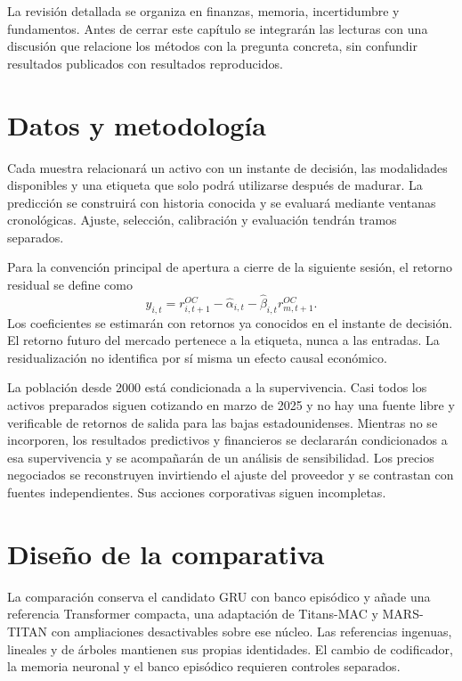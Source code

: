 \documentclass[11pt,a4paper]{report}
\begin{document}
La revisión detallada se organiza en finanzas, memoria, incertidumbre y fundamentos.
Antes de cerrar este capítulo se integrarán las lecturas con una discusión que
relacione los métodos con la pregunta concreta, sin confundir resultados publicados
con resultados reproducidos.

\chapter{Datos y metodología}
Cada muestra relacionará un activo con un instante de decisión, las modalidades
disponibles y una etiqueta que solo podrá utilizarse después de madurar. La
predicción se construirá con historia conocida y se evaluará mediante ventanas
cronológicas. Ajuste, selección, calibración y evaluación tendrán tramos separados.

Para la convención principal de apertura a cierre de la siguiente sesión,
el retorno residual se define como
\begin{equation}
y_{i,t} = r^{OC}_{i,t+1} - \hat\alpha_{i,t}
          - \hat\beta_{i,t} r^{OC}_{m,t+1}.
\end{equation}
Los coeficientes se estimarán con retornos ya conocidos en el instante de decisión.
El retorno futuro del mercado pertenece a la etiqueta, nunca a las entradas.
La residualización no identifica por sí misma un efecto causal económico.

La población desde 2000 está condicionada a la supervivencia. Casi todos los
activos preparados siguen cotizando en marzo de 2025 y no hay una fuente libre
y verificable de retornos de salida para las bajas estadounidenses. Mientras no
se incorporen, los resultados predictivos y financieros se declararán
condicionados a esa supervivencia y se acompañarán de un análisis de
sensibilidad. Los precios negociados se reconstruyen invirtiendo el ajuste del
proveedor y se contrastan con fuentes independientes. Sus acciones
corporativas siguen incompletas.

\chapter{Diseño de la comparativa}
La comparación conserva el candidato GRU con banco episódico y añade una
referencia Transformer compacta, una adaptación de Titans-MAC y MARS-TITAN con
ampliaciones desactivables sobre ese núcleo. Las referencias ingenuas, lineales
y de árboles mantienen sus propias identidades. El cambio de codificador,
la memoria neuronal y el banco episódico requieren controles separados.
\end{document}
